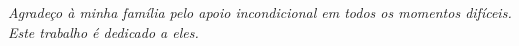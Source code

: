 \begin{dedicatoria}
   \vspace*{\fill}
   \begin{flushright}
   
  \textit{Agradeço à minha família pelo apoio incondicional em todos os momentos difíceis.\\
  Este trabalho é dedicado a eles.}
     
   \end{flushright}
   \vspace*{\fill}
\end{dedicatoria}
